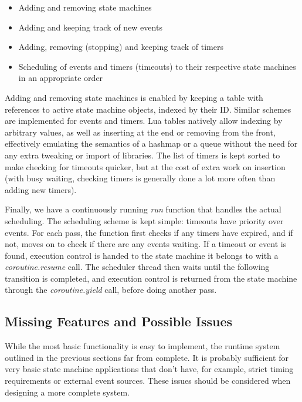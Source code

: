 \begin{itemize}
	\item Adding and removing state machines
	\item Adding and keeping track of new events
	\item Adding, removing (stopping) and keeping track of timers
	\item Scheduling of events and timers (timeouts) to their respective state machines in an appropriate order
\end{itemize}

\noindent
Adding and removing state machines is enabled by keeping a table with references to active state machine objects, indexed by their ID. Similar schemes are implemented for events and timers. Lua tables natively allow indexing by arbitrary values, as well as inserting at the end or removing from the front, effectively emulating the semantics of a hashmap or a queue without the need for any extra tweaking or import of libraries. The list of timers is kept sorted to make checking for timeouts quicker, but at the cost of extra work on insertion (with busy waiting, checking timers is generally done a lot more often than adding new timers).

\noindent
Finally, we have a continuously running \emph{run} function that handles the actual scheduling. The scheduling scheme is kept simple: timeouts have priority over events. For each pass, the function first checks if any timers have expired, and if not, moves on to check if there are any events waiting. If a timeout or event is found, execution control is handed to the state machine it belongs to with a \emph{coroutine.resume} call. The scheduler thread then waits until the following transition is completed, and execution control is returned from the state machine through the \emph{coroutine.yield} call, before doing another pass.

\subsection{Missing Features and Possible Issues}
\label{sec:runtime_system_issues}
While the most basic functionality is easy to implement, the runtime system outlined in the previous sections far from complete. It is probably sufficient for very basic state machine applications that don't have, for example, strict timing requirements or external event sources. These issues should be considered when designing a more complete system.

